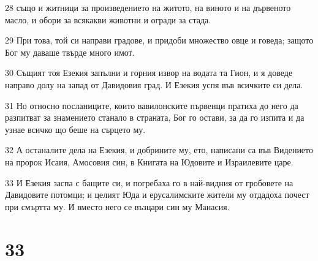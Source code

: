 \par 28 също и житници за произведението на житото, на виното и на дървеното масло, и обори за всякакви животни и огради за стада.
\par 29 При това, той си направи градове, и придоби множество овце и говеда; защото Бог му даваше твърде много имот.
\par 30 Същият тоя Езекия запълни и горния извор на водата та Гион, и я доведе направо долу на запад от Давидовия град. И Езекия успя във всичките си дела.
\par 31 Но относно посланиците, които вавилонските първенци пратиха до него да разпитват за знамението станало в страната, Бог го остави, за да го изпита и да узнае всичко що беше на сърцето му.
\par 32 А останалите дела на Езекия, и добрините му, ето, написани са във Видението на пророк Исаия, Амосовия син, в Книгата на Юдовите и Израилевите царе.
\par 33 И Езекия заспа с бащите си, и погребаха го в най-видния от гробовете на Давидовите потомци; и целият Юда и ерусалимските жители му отдадоха почест при смъртта му. И вместо него се възцари син му Манасия.

\chapter{33}

